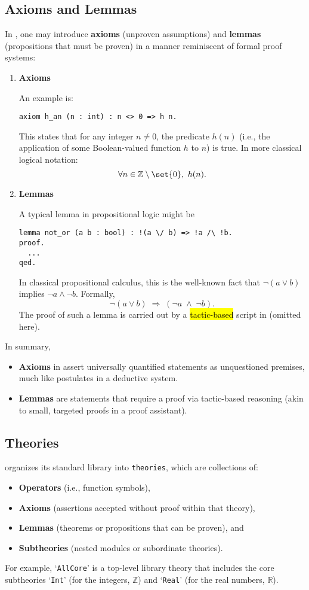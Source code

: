 \subsection{Axioms and Lemmas}
In \EasyCrypt, one may introduce \textbf{axioms} (unproven assumptions) and \textbf{lemmas} (propositions that must be proven) in a manner reminiscent of formal proof systems:
\begin{enumerate}
	\item \textbf{Axioms} 
	
	An example is: \\
\begin{lstlisting}[style=easycrypt]
axiom h_an (n : int) : n <> 0 => h n.
\end{lstlisting}
	This states that for any integer \(n\neq 0\), the predicate \(h(n)\) (i.e., the application of some Boolean-valued function \(h\) to \(n\)) is true. In more classical logical notation:  
	\[
	\forall n \in \mathbb{Z}\setminus\set{0},\ h(n).
	\]
	\item \textbf{Lemmas}
	
	A typical lemma in propositional logic might be \\
\begin{lstlisting}[style=easycrypt]
lemma not_or (a b : bool) : !(a \/ b) => !a /\ !b.
proof.
  ...
qed.
\end{lstlisting}
	In classical propositional calculus, this is the well-known fact that \(\neg (a \lor b)\) implies \(\neg a \land \neg b\). Formally,  
	\[
	\neg (a \lor b)\;\Rightarrow\;(\neg a \;\land\;\neg b).
	\]  
	The proof of such a lemma is carried out by a \hl{tactic-based} script in \EasyCrypt (omitted here).
\end{enumerate}\vfill\noindent
In summary, \begin{itemize}
\item \textbf{Axioms} in \EasyCrypt assert universally quantified statements as unquestioned premises, much like postulates in a deductive system.
\item \textbf{Lemmas} are statements that require a proof via tactic-based reasoning (akin to small, targeted proofs in a proof assistant).
\end{itemize}

\newpage
\subsection{Theories}
\EasyCrypt organizes its standard library into \texttt{theories}, which are collections of:
\begin{itemize}
	\item \textbf{Operators} (i.e., function symbols),  
	\item \textbf{Axioms} (assertions accepted without proof within that theory),  
	\item \textbf{Lemmas} (theorems or propositions that can be proven), and  
	\item \textbf{Subtheories} (nested modules or subordinate theories).
\end{itemize}
For example, `\texttt{AllCore}' is a top-level library theory that includes the core subtheories `\texttt{Int}' (for the integers, \(\mathbb{Z}\)) and `\texttt{Real}' (for the real numbers, \(\mathbb{R}\)).  

